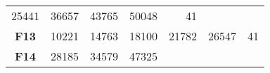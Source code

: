 \documentclass[12pt,a4paper]{article}
\begin{document}
\begin{longtable}[c]{@{}crrrrrr@{}}
\begin{minipage}[t]{0.08\columnwidth}
25441
\strut\end{minipage} &
\begin{minipage}[t]{0.09\columnwidth}\raggedleft\strut
36657
\strut\end{minipage} &
\begin{minipage}[t]{0.10\columnwidth}\raggedleft\strut
43765
\strut\end{minipage} &
\begin{minipage}[t]{0.11\columnwidth}\raggedleft\strut
50048
\strut\end{minipage} &
\begin{minipage}[t]{0.07\columnwidth}\raggedleft\strut
41
\strut\end{minipage}\tabularnewline
\begin{minipage}[t]{0.11\columnwidth}\centering\strut
\textbf{F13}
\strut\end{minipage} &
\begin{minipage}[t]{0.08\columnwidth}\raggedleft\strut
10221
\strut\end{minipage} &
\begin{minipage}[t]{0.08\columnwidth}\raggedleft\strut
14763
\strut\end{minipage} &
\begin{minipage}[t]{0.09\columnwidth}\raggedleft\strut
18100
\strut\end{minipage} &
\begin{minipage}[t]{0.10\columnwidth}\raggedleft\strut
21782
\strut\end{minipage} &
\begin{minipage}[t]{0.11\columnwidth}\raggedleft\strut
26547
\strut\end{minipage} &
\begin{minipage}[t]{0.07\columnwidth}\raggedleft\strut
41
\strut\end{minipage}\tabularnewline
\begin{minipage}[t]{0.11\columnwidth}\centering\strut
\textbf{F14}
\strut\end{minipage} &
\begin{minipage}[t]{0.08\columnwidth}\raggedleft\strut
28185
\strut\end{minipage} &
\begin{minipage}[t]{0.08\columnwidth}\raggedleft\strut
34579
\strut\end{minipage} &
\begin{minipage}[t]{0.09\columnwidth}\raggedleft\strut
47325
\strut\end{minipage} &
\begin{minipage}[t]{0.10\columnwidth}\raggedleft\strut

\end{minipage}
\end{longtable}
\end{document}

